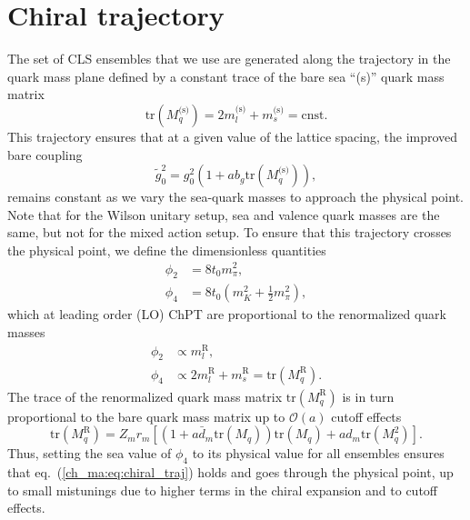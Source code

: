 
\section{Chiral trajectory}
\label{ch_ma:sec:chiral_traj}

The set of CLS ensembles that we use are generated along the trajectory in the quark mass plane defined by a constant trace of the bare sea ``(s)'' quark mass matrix
\begin{equation}
\label{ch_ma:eq:chiral_traj}
{\textrm{tr}}\left(M_q^{\textrm{(s)}}\right)=2m_l^{\textrm{(s)}}+m_s^{\textrm{(s)}}={\textrm{cnst}}.
\end{equation}
This trajectory ensures that at a given value of the lattice spacing, the improved bare coupling 
\begin{equation}
\tilde{g}_0^2=g_0^2\left(1+ab_g{\textrm{tr}}\left(M_q^{\textrm{(s)}}\right)\right),
\end{equation}
remains constant as we vary the sea-quark masses to approach the physical point. Note that for the Wilson unitary setup, sea and valence quark masses are the same, but not for the mixed action setup. To ensure that this trajectory crosses the physical point, we define the dimensionless quantities
\begin{align}
\label{ch_ma:eq:phi2}
\phi_2&=8t_0m_{\pi}^2,\\
\label{ch_ma:eq:phi4}
\phi_4&=8t_0\left(m_K^2+\frac{1}{2}m_{\pi}^2\right),
\end{align}
which at leading order (LO) ChPT are proportional to the renormalized quark masses
\begin{align}
\phi_2&\propto m_l^{\textrm{R}},\\
\phi_4&\propto2m_l^{\textrm{R}}+m_s^{\textrm{R}}={\textrm{tr}}\left(M_q^{\textrm{R}}\right).
\end{align}
The trace of the renormalized quark mass matrix ${\textrm{tr}}\left(M_q^{\textrm{R}}\right)$ is in turn proportional to the bare quark mass matrix up to $\mathcal{O}(a)$ cutoff effects
\begin{equation}
{\textrm{tr}}\left(M_q^{\textrm{R}}\right)=Z_mr_m\left[\left(1+a\bar{d}_m{\textrm{tr}}\left(M_q\right)\right){\textrm{tr}}\left(M_q\right)+ad_m{\textrm{tr}}\left(M_q^2\right)\right].
\end{equation}
Thus, setting the sea value of $\phi_4$ to its physical value for all ensembles ensures that eq.~(\ref{ch_ma:eq:chiral_traj}) holds and goes through the physical point, up to small mistunings due to higher terms in the chiral expansion and to cutoff effects. 

